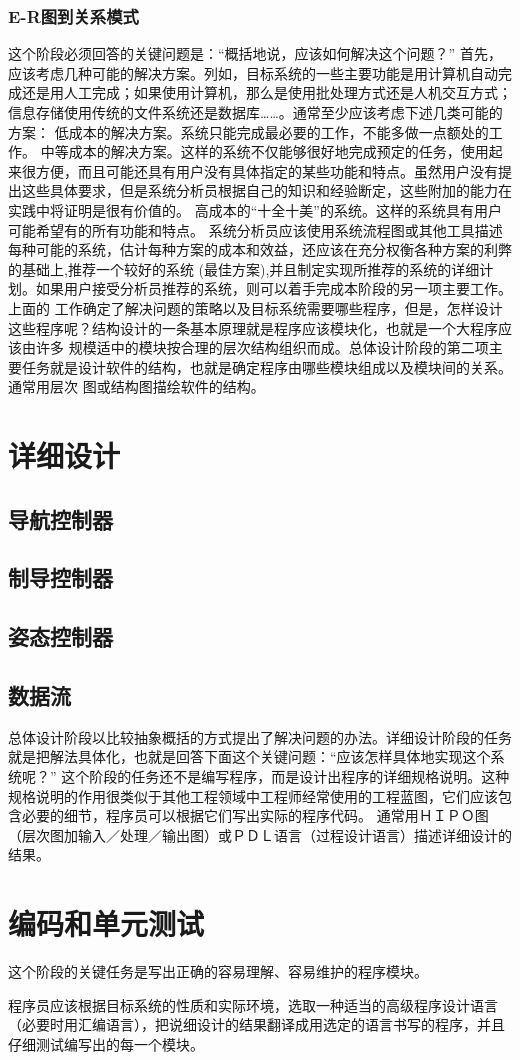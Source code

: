             \subsubsection{E-R图到关系模式}
        
    这个阶段必须回答的关键问题是：“概括地说，应该如何解决这个问题？”
    首先，应该考虑几种可能的解决方案。列如，目标系统的一些主要功能是用计算机自动完成还是用人工完成；如果使用计算机，那么是使用批处理方式还是人机交互方式；信息存储使用传统的文件系统还是数据库……。通常至少应该考虑下述几类可能的方案：
    低成本的解决方案。系统只能完成最必要的工作，不能多做一点额处的工作。
    中等成本的解决方案。这样的系统不仅能够很好地完成预定的任务，使用起来很方便，而且可能还具有用户没有具体指定的某些功能和特点。虽然用户没有提出这些具体要求，但是系统分析员根据自己的知识和经验断定，这些附加的能力在实践中将证明是很有价值的。
    高成本的“十全十美”的系统。这样的系统具有用户可能希望有的所有功能和特点。
    系统分析员应该使用系统流程图或其他工具描述每种可能的系统，估计每种方案的成本和效益，还应该在充分权衡各种方案的利弊的基础上,推荐一个较好的系统 (最佳方案),并且制定实现所推荐的系统的详细计划。如果用户接受分析员推荐的系统，则可以着手完成本阶段的另一项主要工作。
    上面的 工作确定了解决问题的策略以及目标系统需要哪些程序，但是，怎样设计这些程序呢？结构设计的一条基本原理就是程序应该模块化，也就是一个大程序应该由许多 规模适中的模块按合理的层次结构组织而成。总体设计阶段的第二项主要任务就是设计软件的结构，也就是确定程序由哪些模块组成以及模块间的关系。通常用层次 图或结构图描绘软件的结构。


    \section{详细设计}
    \subsection{导航控制器}
    \subsection{制导控制器}
    \subsection{姿态控制器}
    \subsection{数据流}
    总体设计阶段以比较抽象概括的方式提出了解决问题的办法。详细设计阶段的任务就是把解法具体化，也就是回答下面这个关键问题：“应该怎样具体地实现这个系统呢？”
  这个阶段的任务还不是编写程序，而是设计出程序的详细规格说明。这种规格说明的作用很类似于其他工程领域中工程师经常使用的工程蓝图，它们应该包含必要的细节，程序员可以根据它们写出实际的程序代码。
  通常用ＨＩＰＯ图（层次图加输入／处理／输出图）或ＰＤＬ语言（过程设计语言）描述详细设计的结果。

    \section{编码和单元测试}
  这个阶段的关键任务是写出正确的容易理解、容易维护的程序模块。\par
  程序员应该根据目标系统的性质和实际环境，选取一种适当的高级程序设计语言（必要时用汇编语言），把说细设计的结果翻译成用选定的语言书写的程序，并且仔细测试编写出的每一个模块。
